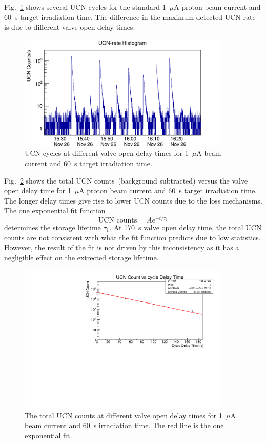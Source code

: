 Fig.~\ref{fig:storage_all} shows several UCN cycles for the standard
1~$\mu$A proton beam current and 60~s target irradiation time. The
difference in the maximum detected UCN rate is due to different valve
open delay times.
\begin{figure}[h!]
  \centering
  \includegraphics[width=0.9\textwidth]{storagetime_all.png}
  \caption{UCN cycles at different valve open delay times for 1~$\mu$A
    beam current and 60~s target irradiation time.}
  \label{fig:storage_all}
\end{figure}
Fig.~\ref{fig:storage_example} shows the total UCN counts~(background
subtracted) versus the valve open delay time for 1~$\mu$A proton beam
current and 60~s target irradiation time. The longer delay times give rise to
lower UCN counts due to the loss mechanisms. The one exponential fit
function
\begin{equation}
\text{UCN counts} = A e^{-t/\tau_1}
\end{equation}
determines the storage lifetime $\tau_1$. At 170~s valve open delay
time, the total UCN counts are not consistent with what the fit
function predicts due to low statistics. However, the result of the
fit is not driven by this inconsistency as it has a negligible effect
on the extrected storage lifetime.

\begin{figure}[h!]
  \centering
  \includegraphics[width=0.9\textwidth]{17002_StorageLifetime.pdf}
  \caption{The total UCN counts at different valve open delay times
    for 1~$\mu$A beam current and 60~s irradiation time. The red line
    is the one exponential fit. }
  \label{fig:storage_example}
\end{figure}


